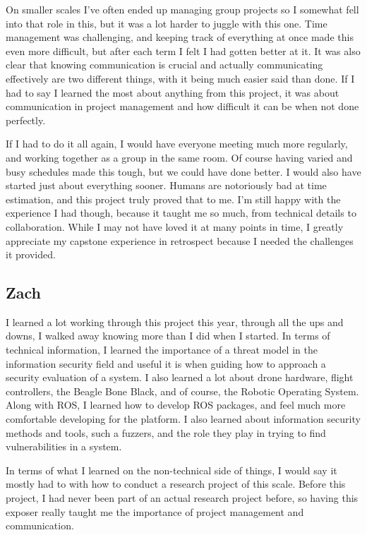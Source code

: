 \documentclass[IEEEtran,letterpaper,10pt,notitlepage,draftclsnofoot,onecolumn]{article}
\begin{document}
On smaller scales I've often ended up managing group projects so I somewhat fell into that role in this, but it was a lot harder to juggle with this one.
Time management was challenging, and keeping track of everything at once made this even more difficult, but after each term I felt I had gotten better at it.
It was also clear that knowing communication is crucial and actually communicating effectively are two different things, with it being much easier said than done.
If I had to say I learned the most about anything from this project, it was about communication in project management and how difficult it can be when not done perfectly.

If I had to do it all again, I would have everyone meeting much more regularly, and working together as a group in the same room.
Of course having varied and busy schedules made this tough, but we could have done better.
I would also have started just about everything sooner.
Humans are notoriously bad at time estimation, and this project truly proved that to me.
I'm still happy with the experience I had though, because it taught me so much, from technical details to collaboration.
While I may not have loved it at many points in time, I greatly appreciate my capstone experience in retrospect because I needed the challenges it provided.

\subsection{Zach}

I learned a lot working through this project this year, through all the ups and downs, I walked away
knowing more than I did when I started. In terms of technical information, I learned the importance of a
threat model in the information security field and useful it is when guiding how to approach a security
evaluation of a system. I also learned a lot about drone hardware, flight controllers, the Beagle Bone Black,
and of course, the Robotic Operating System. Along with ROS, I learned how to develop ROS packages, and feel
much more comfortable developing for the platform. I also learned about information security methods and
tools, such a fuzzers, and the role they play in trying to find vulnerabilities in a system.

In terms of what I learned on the non-technical side of things, I would say it mostly had to with how to
conduct a research project of this scale. Before this project, I had never been part of an actual research
project before, so having this exposer really taught me the importance of project management and communication.
\end{document}
